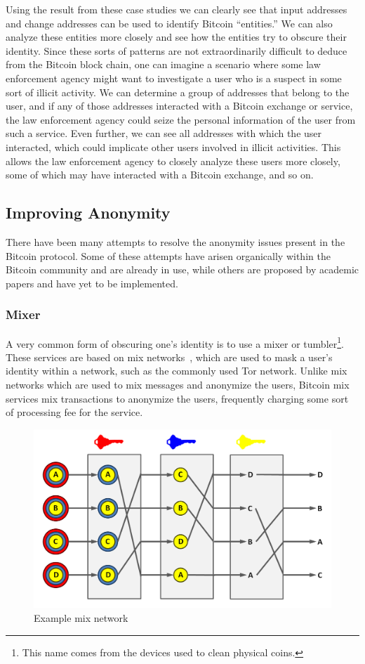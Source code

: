 \documentclass[11pt]{article}
\begin{document}
Using the result from these case studies we can clearly see that input addresses and
change addresses can be used to identify Bitcoin ``entities.'' We can also analyze
these entities more closely and see how the entities try to obscure their
identity. Since these sorts of patterns are not extraordinarily difficult to
deduce from the Bitcoin block chain, one can imagine a scenario where some law
enforcement agency might want to investigate a user who is a suspect in some
sort of illicit activity. We can determine a group of addresses that belong to
the user, and if any of those addresses interacted with a Bitcoin exchange or
service, the law enforcement agency could seize the personal
information of the user from such a service. Even further, we can see all
addresses with which the user interacted, which could implicate other users
involved in illicit activities. This allows the law enforcement agency to
closely analyze these users more closely, some of which may have interacted with
a Bitcoin exchange, and so on.

\subsection{Improving Anonymity}
There have been many attempts to resolve the anonymity issues present in the
Bitcoin protocol. Some of these attempts have arisen organically within the
Bitcoin community and are already in use, while others are proposed by academic
papers and have yet to be implemented.

\subsubsection{Mixer}
A very common form of obscuring one's identity is to use a mixer or
tumbler\footnote{This name comes from the devices used to clean physical coins.}.
These services are based on mix networks~\cite{chaum81}, which are used to mask
a user's identity within a network, such as the commonly used Tor network.
Unlike mix networks which are used to mix messages and anonymize the
users, Bitcoin mix services mix transactions to anonymize the users, frequently
charging some sort of processing fee for the service.

\begin{figure}[H]
    \caption[Example mix network]{Example mix network\protect\footnotemark}
    \centering
    \includegraphics[width=.8\linewidth,natwidth=1308,natheight=786]{figures/mix.png}
\end{figure}
\end{document}
